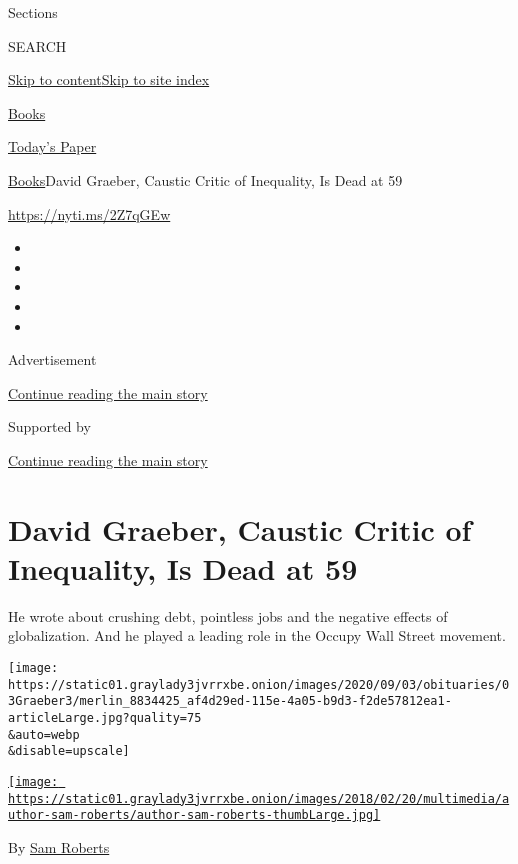 Sections

SEARCH

\protect\hyperlink{site-content}{Skip to
content}\protect\hyperlink{site-index}{Skip to site index}

\href{https://www.nytimes3xbfgragh.onion/section/books}{Books}

\href{https://myaccount.nytimes3xbfgragh.onion/auth/login?response_type=cookie\&client_id=vi}{}

\href{https://www.nytimes3xbfgragh.onion/section/todayspaper}{Today's
Paper}

\href{/section/books}{Books}\textbar{}David Graeber, Caustic Critic of
Inequality, Is Dead at 59

\url{https://nyti.ms/2Z7qGEw}

\begin{itemize}
\item
\item
\item
\item
\item
\end{itemize}

Advertisement

\protect\hyperlink{after-top}{Continue reading the main story}

Supported by

\protect\hyperlink{after-sponsor}{Continue reading the main story}

\hypertarget{david-graeber-caustic-critic-of-inequality-is-dead-at-59}{%
\section{David Graeber, Caustic Critic of Inequality, Is Dead at
59}\label{david-graeber-caustic-critic-of-inequality-is-dead-at-59}}

He wrote about crushing debt, pointless jobs and the negative effects of
globalization. And he played a leading role in the Occupy Wall Street
movement.

\texttt{[image: https://static01.graylady3jvrrxbe.onion/images/2020/09/03/obituaries/03Graeber3/merlin\_8834425\_af4d29ed-115e-4a05-b9d3-f2de57812ea1-articleLarge.jpg?quality=75\\\&auto=webp\\\&disable=upscale]}

\href{https://www.nytimes3xbfgragh.onion/by/sam-roberts}{\texttt{[image: https://static01.graylady3jvrrxbe.onion/images/2018/02/20/multimedia/author-sam-roberts/author-sam-roberts-thumbLarge.jpg]}}

By \href{https://www.nytimes3xbfgragh.onion/by/sam-roberts}{Sam Roberts}

